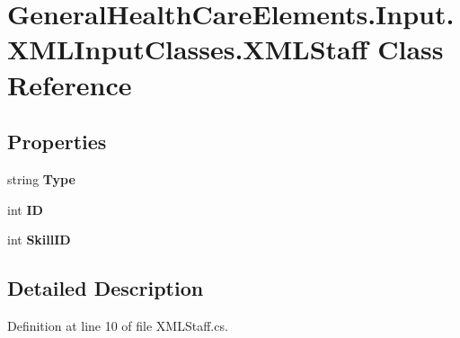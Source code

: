 \hypertarget{class_general_health_care_elements_1_1_input_1_1_x_m_l_input_classes_1_1_x_m_l_staff}{}\section{General\+Health\+Care\+Elements.\+Input.\+X\+M\+L\+Input\+Classes.\+X\+M\+L\+Staff Class Reference}
\label{class_general_health_care_elements_1_1_input_1_1_x_m_l_input_classes_1_1_x_m_l_staff}
\subsection*{Properties}
\begin{DoxyCompactItemize}
\item 
string {\bfseries Type}\hypertarget{class_general_health_care_elements_1_1_input_1_1_x_m_l_input_classes_1_1_x_m_l_staff_a1bd1b90b9bc60cc6a0ac793d002becdd}{}\label{class_general_health_care_elements_1_1_input_1_1_x_m_l_input_classes_1_1_x_m_l_staff_a1bd1b90b9bc60cc6a0ac793d002becdd}

\item 
int {\bfseries ID}\hypertarget{class_general_health_care_elements_1_1_input_1_1_x_m_l_input_classes_1_1_x_m_l_staff_a9bd7b9ff3285d7647c6bcb50bf5edc64}{}\label{class_general_health_care_elements_1_1_input_1_1_x_m_l_input_classes_1_1_x_m_l_staff_a9bd7b9ff3285d7647c6bcb50bf5edc64}

\item 
int {\bfseries Skill\+ID}\hypertarget{class_general_health_care_elements_1_1_input_1_1_x_m_l_input_classes_1_1_x_m_l_staff_a57b6df09e14b58e834427f5cdf13d0cc}{}\label{class_general_health_care_elements_1_1_input_1_1_x_m_l_input_classes_1_1_x_m_l_staff_a57b6df09e14b58e834427f5cdf13d0cc}

\end{DoxyCompactItemize}


\subsection{Detailed Description}


Definition at line 10 of file X\+M\+L\+Staff.\+cs.

